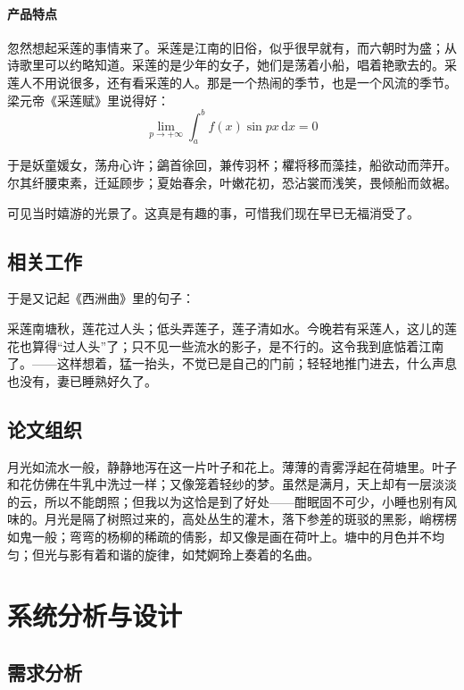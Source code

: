 \documentclass[printMode]{ecnuthesis}
\begin{document}
\subsubsection{产品特点}

忽然想起采莲的事情来了。采莲是江南的旧俗，似乎很早就有，而六朝时为盛；从诗歌里可以约略知道。采莲的是少年的女子，她们是荡着小船，唱着艳歌去的。采莲人不用说很多，还有看采莲的人。那是一个热闹的季节，也是一个风流的季节。梁元帝《采莲赋》里说得好：
\begin{equation}
  \lim_{p\to+\infty}\int_{a}^{b}f(x)\sin{px}\,\mathrm{d}x = 0
\end{equation}

于是妖童媛女，荡舟心许；鷁首徐回，兼传羽杯；欋将移而藻挂，船欲动而萍开。尔其纤腰束素，迁延顾步；夏始春余，叶嫩花初，恐沾裳而浅笑，畏倾船而敛裾。

可见当时嬉游的光景了。这真是有趣的事，可惜我们现在早已无福消受了。

\section{相关工作}

于是又记起《西洲曲》里的句子：

采莲南塘秋，莲花过人头；低头弄莲子，莲子清如水。今晚若有采莲人，这儿的莲花也算得“过人头”了；只不见一些流水的影子，是不行的。这令我到底惦着江南了。——这样想着，猛一抬头，不觉已是自己的门前；轻轻地推门进去，什么声息也没有，妻已睡熟好久了。

\section{论文组织}

月光如流水一般，静静地泻在这一片叶子和花上。薄薄的青雾浮起在荷塘里。叶子和花仿佛在牛乳中洗过一样；又像笼着轻纱的梦。虽然是满月，天上却有一层淡淡的云，所以不能朗照；但我以为这恰是到了好处——酣眠固不可少，小睡也别有风味的。月光是隔了树照过来的，高处丛生的灌木，落下参差的斑驳的黑影，峭楞楞如鬼一般；弯弯的杨柳的稀疏的倩影，却又像是画在荷叶上。塘中的月色并不均匀；但光与影有着和谐的旋律，如梵婀玲上奏着的名曲。


\chapter{系统分析与设计}

\section{需求分析}
\end{document}
